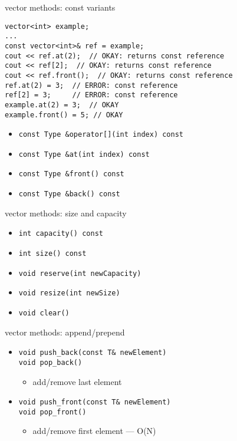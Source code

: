     \begin{frame}[fragile,label=vectMethConst]{vector methods: const variants}
\lstset{
    language=C++,
    style=small
}
\begin{lstlisting}
vector<int> example;
...
const vector<int>& ref = example;
cout << ref.at(2);  // OKAY: returns const reference
cout << ref[2];  // OKAY: returns const reference
cout << ref.front();  // OKAY: returns const reference
ref.at(2) = 3;  // ERROR: const reference
ref[2] = 3;     // ERROR: const reference
example.at(2) = 3;  // OKAY
example.front() = 5; // OKAY
\end{lstlisting}
\begin{itemize}
\item \lstinline|const Type &operator[](int index) const|
\item \lstinline|const Type &at(int index) const|
\item \lstinline|const Type &front() const|
\item \lstinline|const Type &back() const|
\end{itemize}
\end{frame}

    \begin{frame}[fragile,label=vectMethSize]{vector methods: size and capacity}
\lstset{
    language=C++,
    style=small
}
\begin{itemize}
\item \lstinline|int capacity() const|
\item \lstinline|int size() const|
\item \lstinline|void reserve(int newCapacity)|
\item \lstinline|void resize(int newSize)|
\item \lstinline|void clear()|
\end{itemize}
\end{frame}


\begin{frame}[fragile,label=vectMethApp]{vector methods: append/prepend}
\lstset{
    language=C++,
    style=small
}
\begin{itemize}
\item \lstinline|void push_back(const T& newElement)| \\
      \lstinline|void pop_back()|
\begin{itemize}\item add/remove last element\end{itemize}
\item \lstinline|void push_front(const T& newElement)| \\
      \lstinline|void pop_front()|
\begin{itemize}\item add/remove first element --- O(N)\end{itemize}
\end{itemize}
\end{frame}
